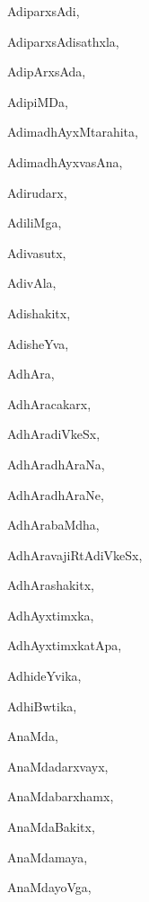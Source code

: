 \begin{multicols}{3}
{\noindent
{AdiparxsAdi}, \pageref{AdiparxsAdi}

\noindent
{AdiparxsAdisathxla}, \pageref{AdiparxsAdisathxla}

\noindent
{AdipArxsAda}, \pageref{AdipArxsAda}

\noindent
{AdipiMDa}, \pageref{AdipiMDa}

\noindent
{AdimadhAyxMtarahita}, \pageref{AdimadhAyxMtarahita}

\noindent
{AdimadhAyxvasAna}, \pageref{AdimadhAyxvasAna}

\noindent
{Adirudarx}, \pageref{Adirudarx}

\noindent
{AdiliMga}, \pageref{AdiliMga}

\noindent
{Adivasutx}, \pageref{Adivasutx}

\noindent
{AdivAla}, \pageref{AdivAla}

\noindent
{Adishakitx}, \pageref{Adishakitx}

\noindent
{AdisheYva}, \pageref{AdisheYva}

\noindent
{AdhAra}, \pageref{AdhAra}

\noindent
{AdhAracakarx}, \pageref{AdhAracakarx}

\noindent
{AdhAradiVkeSx}, \pageref{AdhAradiVkeSx}

\noindent
{AdhAradhAraNa}, \pageref{AdhAradhAraNa}

\noindent
{AdhAradhAraNe}, \pageref{AdhAradhAraNe}

\noindent
{AdhArabaMdha}, \pageref{AdhArabaMdha}

\noindent
{AdhAravajiRtAdiVkeSx}, \pageref{AdhAravajiRtAdiVkeSx}

\noindent
{AdhArashakitx}, \pageref{AdhArashakitx}

\noindent
{AdhAyxtimxka}, \pageref{AdhAyxtimxka}

\noindent
{AdhAyxtimxkatApa}, \pageref{AdhAyxtimxkatApa}

\noindent
{AdhideYvika}, \pageref{AdhideYvika}

\noindent
{AdhiBwtika}, \pageref{AdhiBwtika}

\noindent
{AnaMda}, \pageref{AnaMda}

\noindent
{AnaMdadarxvayx}, \pageref{AnaMdadarxvayx}

\noindent
{AnaMdabarxhamx}, \pageref{AnaMdabarxhamx}

\noindent
{AnaMdaBakitx}, \pageref{AnaMdaBakitx}

\noindent
{AnaMdamaya}, \pageref{AnaMdamaya}

\noindent
{AnaMdayoVga}, \pageref{AnaMdayoVga}

}
\end{multicols}
